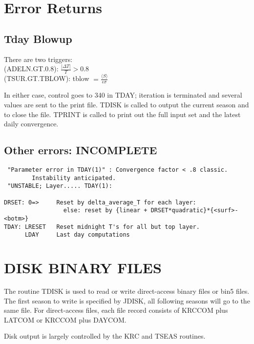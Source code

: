 \documentclass[draft]{article}  %
\newcommand{\qi}{\\ \hspace*{2.em}}      %
\begin{document}
\section{Error Returns} %
\subsection{Tday Blowup} %
There are two triggers:
\qi  (ADELN.GT.0.8):  $\frac{ | \Delta T |}{T} > 0.8$ 
\qi (TSUR.GT.TBLOW): tblow $= \frac{\langle S \rangle}{\epsilon \sigma}$

In either case, control goes to 340 in TDAY; iteration is terminated and several values are sent to the print file. TDISK is called to output the current season and to close the file. TPRINT is called to print out the full input set and the latest daily convergence.   

\subsection{Other errors: INCOMPLETE} %
\vspace{-3.mm} 
\begin{verbatim}
 "Parameter error in TDAY(1)" : Convergence factor < .8 classic. 
        Instability anticipated.  
 "UNSTABLE; Layer..... TDAY(1): 

DRSET: 0=>     Reset by delta_average_T for each layer:
                 else: reset by {linear + DRSET*quadratic}*{<surf>-<botm>}
TDAY: LRESET   Reset midnight T's for all but top layer.
      LDAY     Last day computations
\end{verbatim}


\section{DISK BINARY FILES \label{dbf} } %

The routine TDISK is used to read or write direct-access binary files or bin5
files. The first season to write is specified by JDISK, all following seasons
will go to the same file. For direct-access files, each file record consists of
KRCCOM plus LATCOM or KRCCOM plus DAYCOM.

Disk output is largely controlled by the KRC  and TSEAS routines.
\end{document}
